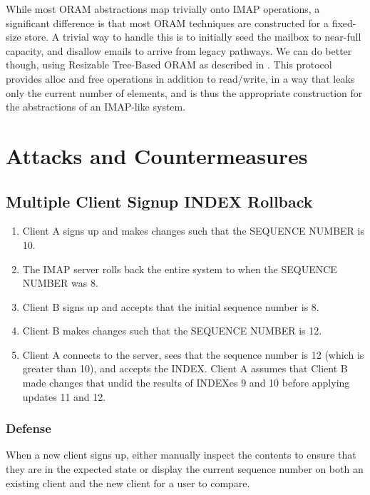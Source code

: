 \documentclass[pageno]{jpaper}
\begin{document}
While most ORAM abstractions map trivially onto IMAP operations, a significant difference is that most ORAM techniques are constructed for a fixed-size store. A trivial way to handle this is to initially seed the mailbox to near-full capacity, and disallow emails to arrive from legacy pathways. We can do better though, using Resizable Tree-Based ORAM as described in \cite{moatazresizable}. This protocol provides alloc and free operations in addition to read/write, in a way that leaks only the current number of elements, and is thus the appropriate construction for the abstractions of an IMAP-like system.

\section{Attacks and Countermeasures}
\subsection{Multiple Client Signup INDEX Rollback}
\begin{enumerate}
\item Client A signs up and makes changes such that the SEQUENCE NUMBER is 10.
\item The IMAP server rolls back the entire system to when the SEQUENCE NUMBER was 8.
\item Client B signs up and accepts that the initial sequence number is 8.
\item Client B makes changes such that the SEQUENCE NUMBER is 12.
\item Client A connects to the server, sees that the sequence number is 12 (which is greater than 10), and accepts the INDEX. Client A assumes that Client B made changes that undid the results of INDEXes 9 and 10 before applying updates 11 and 12.
\end{enumerate}

\subsubsection{Defense}
When a new client signs up, either manually inspect the contents to ensure that they are in the expected state or display the current sequence number on both an existing client and the new client for a user to compare.
\end{document}
